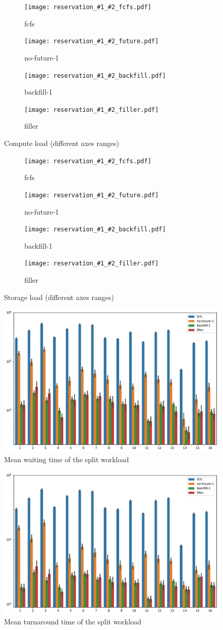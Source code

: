 \documentclass[thesis-en.tex]{subfiles}
\newcommand{\loadplot}[3]{
\begin{figure}[p] 
  \begin{subfigure}{0.5\linewidth}
    \centering
    \texttt{[image: reservation\_\#1\_\#2\_fcfs.pdf]} 
    \caption{fcfs} 
    \label{fig:reservation_#1_#2_fcfs} 
  \end{subfigure}
  \hfill
  \begin{subfigure}{0.5\linewidth}
    \centering
    \texttt{[image: reservation\_\#1\_\#2\_future.pdf]} 
    \caption{no-future-1} 
    \label{fig:reservation_#1_#2_future}
  \end{subfigure} 
  \begin{subfigure}{0.5\linewidth}
    \centering
    \texttt{[image: reservation\_\#1\_\#2\_backfill.pdf]} 
    \caption{backfill-1} 
    \label{fig:reservation_#1_#2_backfill} 
  \end{subfigure}
  \hfill
  \begin{subfigure}{0.5\linewidth}
    \centering
    \texttt{[image: reservation\_\#1\_\#2\_filler.pdf]}
    \caption{filler} 
    \label{fig:reservation_#1_#2_filler} 
  \end{subfigure} 
  \caption{#3}
  \label{fig:reservation_#1_#2} 
\end{figure}
}
\begin{document}


\loadplot{alloc-only}{compute-load}{Compute load (different axes ranges)}
\loadplot{alloc-only}{storage-load}{Storage load (different axes ranges)}

\begin{figure}[p]
    \centering
    \includegraphics[width=\textwidth]{reservation_alloc-only_parts_waiting-time.pdf}
    \caption{Mean waiting time of the split workload}
    \label{fig:reservation_alloc-only_parts_waiting-time}
\end{figure}

\begin{figure}[p]
    \centering
    \includegraphics[width=\textwidth]{reservation_alloc-only_parts_turnaround-time.pdf}
    \caption{Mean turnaround time of the split workload}
    \label{fig:reservation_alloc-only_parts_turnaround-time}
\end{figure}
\end{document}
